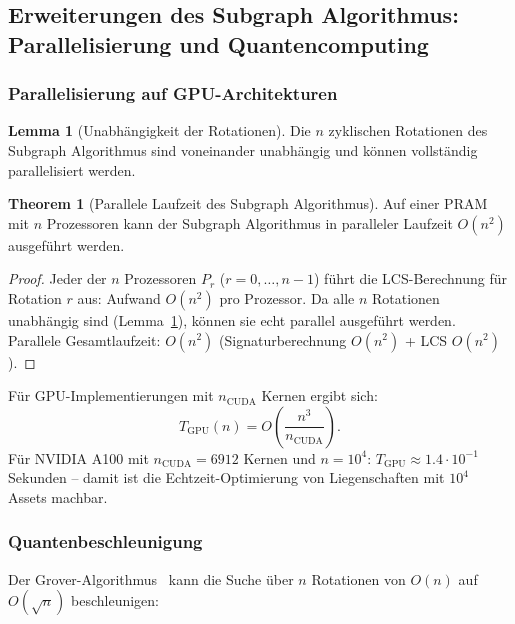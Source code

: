 ﻿\documentclass[a4paper,12pt]{article}
\theoremstyle{definition}
\newtheorem{lemma}{Lemma}[section]
\newtheorem{theorem}{Theorem}[section]
\begin{document}
\subsection{Erweiterungen des Subgraph Algorithmus: Parallelisierung und Quantencomputing}

\subsubsection{Parallelisierung auf GPU-Architekturen}

\begin{lemma}[Unabhängigkeit der Rotationen]
\label{lem:unabhaengigkeit}
Die $n$ zyklischen Rotationen des Subgraph Algorithmus sind voneinander unabhängig
und können vollständig parallelisiert werden.
\end{lemma}

\begin{theorem}[Parallele Laufzeit des Subgraph Algorithmus]
\label{thm:parallel}
Auf einer PRAM mit $n$ Prozessoren kann der Subgraph Algorithmus in
paralleler Laufzeit $O(n^2)$ ausgeführt werden.
\end{theorem}

\begin{proof}
Jeder der $n$ Prozessoren $P_r$ ($r = 0, \ldots, n-1$) führt die LCS-Berechnung
für Rotation $r$ aus: Aufwand $O(n^2)$ pro Prozessor.
Da alle $n$ Rotationen unabhängig sind (Lemma~\ref{lem:unabhaengigkeit}),
können sie echt parallel ausgeführt werden.
Parallele Gesamtlaufzeit: $O(n^2)$ (Signaturberechnung $O(n^2)$ + LCS $O(n^2)$).
\end{proof}

Für GPU-Implementierungen mit $n_{\mathrm{CUDA}}$ Kernen ergibt sich:
\[
    T_{\mathrm{GPU}}(n) = O\!\left(\frac{n^3}{n_{\mathrm{CUDA}}}\right).
\]
Für NVIDIA A100 mit $n_{\mathrm{CUDA}} = 6912$ Kernen und $n = 10^4$:
$T_{\mathrm{GPU}} \approx 1.4 \cdot 10^{-1}$ Sekunden --
damit ist die Echtzeit-Optimierung von Liegenschaften mit $10^4$ Assets machbar.

\subsubsection{Quantenbeschleunigung}

Der Grover-Algorithmus~\cite{grover1996} kann die Suche über $n$ Rotationen
von $O(n)$ auf $O(\sqrt{n})$ beschleunigen:
\end{document}
